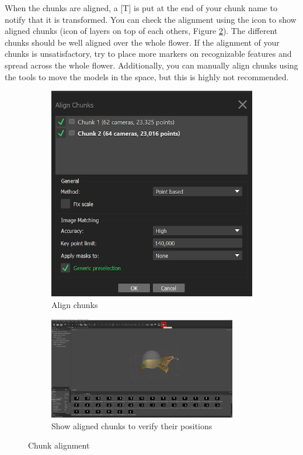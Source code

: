\documentclass[10pt,letter,english]{article}
\begin{document}
When the chunks are aligned, a [T] is put at the end of your chunk name to notify that it is transformed. You can check the alignment using the icon to show aligned chunks (icon of layers on top of each others, Figure \ref{show_aligned_chunk}). 
The different chunks should be well aligned over the whole flower.
If the alignment of your chunks is unsatisfactory, try to place more markers on recognizable features and spread across the whole flower. Additionally, you can manually align chunks using the tools to move the models in the space, but this is highly not recommended.



\begin{figure}[H]
\begin{subfigure}{.4\textwidth}
  \centering
  \includegraphics[width=1\textwidth]{Figures/metashape_align_chunks.png} %
  \caption{Align chunks}
  \label{Align_chunk}
\end{subfigure}
\begin{subfigure}{.7\textwidth}
  \centering
  \includegraphics[width=0.9\textwidth]{Figures/metashape_show_aligned_chunks.png}
  \caption{Show aligned chunks to verify their positions}
  \label{show_aligned_chunk}
\end{subfigure}
\caption{Chunk alignment}
\label{Chunk_alignment}
\end{figure}
\end{document}
